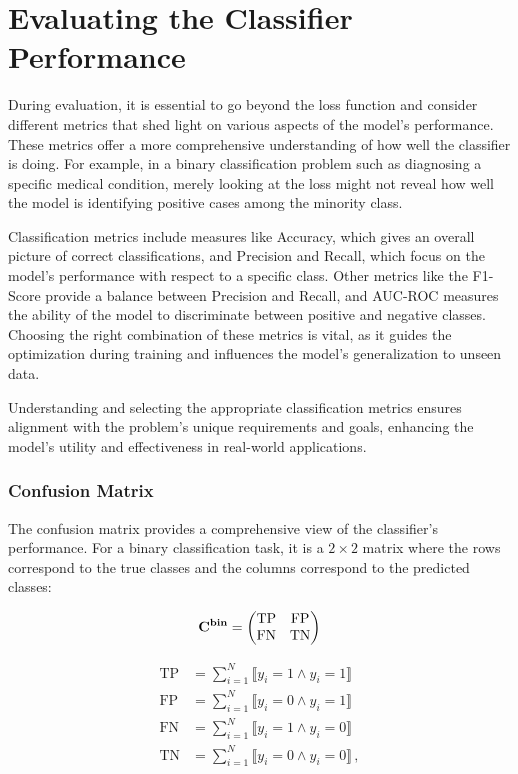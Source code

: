 \section{Evaluating the Classifier Performance}
\label{sec:evaluation}

During evaluation, it is essential to go beyond the loss function and consider different metrics that shed
light on various aspects of the model's performance. These metrics offer a more comprehensive understanding of how well
the classifier is doing. For example, in a binary classification problem such as diagnosing a specific medical
condition, merely looking at the loss might not reveal how well the model is identifying positive cases among the
minority class.

Classification metrics include measures like Accuracy, which gives an overall picture of correct classifications, and
Precision and Recall, which focus on the model's performance with respect to a specific class. Other metrics like the
F1-Score provide a balance between Precision and Recall, and AUC-ROC measures the ability of the model to discriminate
between positive and negative classes. Choosing the right combination of these metrics is vital, as it guides the
optimization during training and influences the model's generalization to unseen data.

Understanding and selecting the appropriate classification metrics ensures alignment with the problem's unique
requirements and goals, enhancing the model's utility and effectiveness in real-world applications.


\subsubsection{Confusion Matrix}
\label{sec:weihted-cm}

The confusion matrix provides a comprehensive view of the classifier's performance. For a binary classification task, it
is a $2\times2$ matrix where the rows correspond to the true classes and the columns correspond to the predicted classes:

\begin{equation}
    \mathbf{C}^{\textbf{bin}} = \begin{pmatrix}
        \text{TP} & \text{FP} \\
        \text{FN} & \text{TN} \\
    \end{pmatrix}
\end{equation}

\begin{align}
    \text{TP} & = \sum_{i=1}^{N} \llbracket y_i = 1 \land \hat{y}_i = 1 \rrbracket    \\
    \text{FP} & = \sum_{i=1}^{N} \llbracket y_i = 0 \land \hat{y}_i = 1 \rrbracket    \\
    \text{FN} & = \sum_{i=1}^{N} \llbracket y_i = 1 \land \hat{y}_i = 0 \rrbracket    \\
    \text{TN} & = \sum_{i=1}^{N} \llbracket y_i = 0 \land \hat{y}_i = 0 \rrbracket\,,
\end{align}


